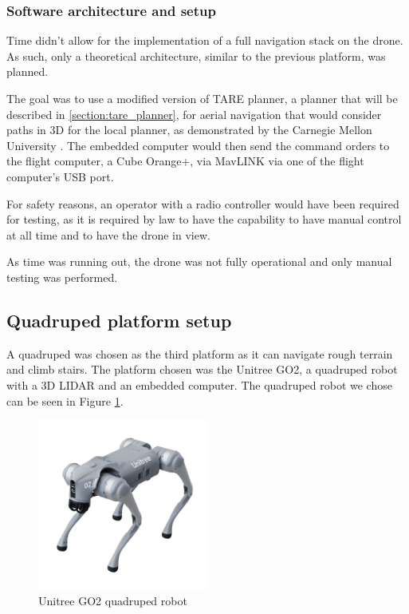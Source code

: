\documentclass[12pt]{article}
\begin{document}
            \subsubsection{Software architecture and setup}
                
                Time didn't allow for the implementation of a full navigation stack on the drone. As such, only a theoretical architecture, similar to the previous platform, was planned.
                
                The goal was to use a modified version of TARE planner, a planner that will be described in \ref{section:tare_planner}, for aerial navigation that would consider paths in 3D for the local planner, as demonstrated by the Carnegie Mellon University \cite{cao2023representation}. The embedded computer would then send the command orders to the flight computer, a Cube Orange+, via MavLINK via one of the flight computer's USB port.

                For safety reasons, an operator with a radio controller would have been required for testing, as it is required by law to have the capability to have manual control at all time and to have the drone in view. 

                As time was running out, the drone was not fully operational and only manual testing was performed.


            
    \subsection{Quadruped platform setup}

        A quadruped was chosen as the third platform as it can navigate rough terrain and climb stairs. The platform chosen was the Unitree GO2, a quadruped robot with a 3D LIDAR and an embedded computer. The quadruped robot we chose can be seen in Figure \ref{fig:go2}.
        
        \begin{figure}[H]
            \centering
            \includegraphics[width=0.5\textwidth]{Images/go2.png}
            \caption{Unitree GO2 quadruped robot}
            \label{fig:go2}
        \end{figure}
\end{document}
